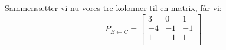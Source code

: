 \documentclass[a4paper,12pt]{article}
\begin{document}
Sammensætter vi nu vores tre kolonner til en matrix, får vi:\\
\[
P_{B\leftarrow C} = 
\left[\begin{array}{ccc}
    3 & 0 & 1\\
    -4 & -1 & -1\\
    1 & -1 & 1\\
\end{array}\right]
\]

\subsection{}


\subsection{}


\subsection{}


\subsection{}
\end{document}
